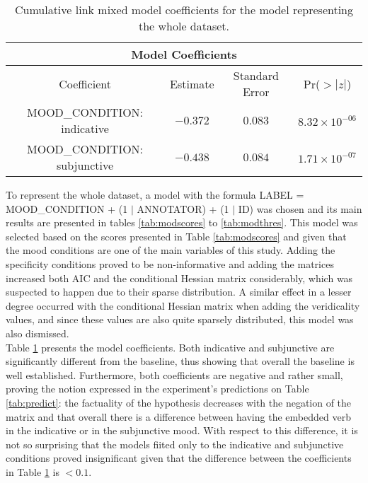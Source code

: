 \begin{table}
\center
  \begin{tabular}{|c|c|c|c|}
  \hline
  \multicolumn{4}{|c|}{Model Coefficients}\\\hline
  Coefficient & Estimate &Standard Error & Pr($>|z|$)\\\hline
MOOD\_CONDITION: indicative  & $-0.372$ &$0.083$ &$8.32\times 10^{-06}$\\\hline
MOOD\_CONDITION: subjunctive & $-0.438$ &$0.084$ &$1.71\times 10^{-07}$\\\hline 
  \end{tabular}
  \caption[Model Coefficients.]{Cumulative link mixed model coefficients for the model representing the whole dataset.}
  \label{tab:modcoeff} 
\end{table}

To represent the whole dataset, a model with the formula LABEL =  MOOD\_CONDITION + (1 $\mid$ ANNOTATOR) +  (1 $\mid$ ID) was chosen and its main results are presented in tables \ref{tab:modscores} to \ref{tab:modthres}. This model was selected based on the scores presented in Table \ref{tab:modscores} and given that the mood conditions are one of the main variables of this study. Adding the specificity conditions proved to be non-informative and adding the matrices increased both AIC and the conditional Hessian matrix considerably, which was suspected to happen due to their sparse distribution. A similar effect in a lesser degree occurred with the conditional Hessian matrix when adding the veridicality values, and since these values are also quite sparsely distributed, this model was also dismissed.\\  

Table \ref{tab:modcoeff} presents the model coefficients. Both indicative and subjunctive are significantly different from the baseline, thus showing that overall the baseline is well established. Furthermore, both coefficients are negative and rather small, proving the notion expressed in the experiment's predictions on Table \ref{tab:predict}: the factuality of the hypothesis decreases with the negation of the matrix and that overall there is a difference between having the embedded verb in the indicative or in the subjunctive mood. With respect to this difference, it is not so surprising that the models fiited only to the indicative and subjunctive conditions proved insignificant given that the difference between the coefficients in Table \ref{tab:modcoeff} is $<0.1$.\\

